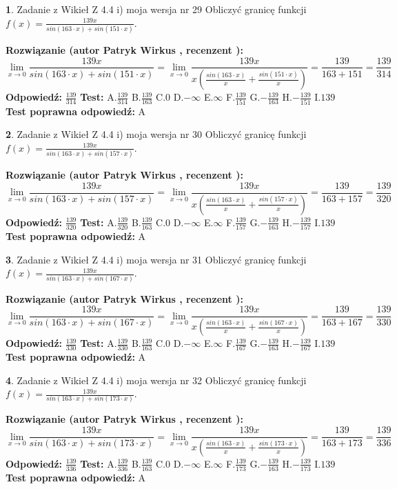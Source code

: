 \documentclass[12pt, a4paper]{article}
\theoremstyle{definition} %
\newtheorem{zad}{}
\newcommand{\zadStart}[1]{\begin{zad}#1\newline}
\newcommand{\zadStop}{\end{zad}}
\newcommand{\rozwStart}[2]{\noindent \textbf{Rozwiązanie (autor #1 , recenzent #2): }\newline}
\newcommand{\rozwStop}{\newline}
\newcommand{\odpStart}{\noindent \textbf{Odpowiedź:}\newline}
\newcommand{\odpStop}{\newline}
\newcommand{\testStart}{\noindent \textbf{Test:}\newline}
\newcommand{\testStop}{\newline}
\newcommand{\kluczStart}{\noindent \textbf{Test poprawna odpowiedź:}\newline}
\newcommand{\kluczStop}{\newline}
\begin{document}
\zadStart{Zadanie z Wikieł Z 4.4 i) moja wersja nr 29}
Obliczyć granicę funkcji $f(x)=\frac{139x}{sin(163\cdot x) +sin(151\cdot x)}$.
\zadStop
\rozwStart{Patryk Wirkus}{}
$$\lim\limits_{x\to 0}\frac{139x}{sin(163\cdot x) +sin(151\cdot x)}=\lim\limits_{x\to 0}\frac{139x}{x(\frac{sin(163\cdot x)}{x}+\frac{sin(151\cdot x)}{x})}=\frac{139}{163+151} = \frac{139}{314}$$
\rozwStop
\odpStart
$\frac{139}{314}$
\odpStop
\testStart
A.$\frac{139}{314}$
B.$\frac{139}{163}$
C.$0$
D.$-\infty$
E.$\infty$
F.$\frac{139}{151}$
G.$-\frac{139}{163}$
H.$-\frac{139}{151}$
I.$139$
\testStop
\kluczStart
A
\kluczStop



\zadStart{Zadanie z Wikieł Z 4.4 i) moja wersja nr 30}
Obliczyć granicę funkcji $f(x)=\frac{139x}{sin(163\cdot x) +sin(157\cdot x)}$.
\zadStop
\rozwStart{Patryk Wirkus}{}
$$\lim\limits_{x\to 0}\frac{139x}{sin(163\cdot x) +sin(157\cdot x)}=\lim\limits_{x\to 0}\frac{139x}{x(\frac{sin(163\cdot x)}{x}+\frac{sin(157\cdot x)}{x})}=\frac{139}{163+157} = \frac{139}{320}$$
\rozwStop
\odpStart
$\frac{139}{320}$
\odpStop
\testStart
A.$\frac{139}{320}$
B.$\frac{139}{163}$
C.$0$
D.$-\infty$
E.$\infty$
F.$\frac{139}{157}$
G.$-\frac{139}{163}$
H.$-\frac{139}{157}$
I.$139$
\testStop
\kluczStart
A
\kluczStop



\zadStart{Zadanie z Wikieł Z 4.4 i) moja wersja nr 31}
Obliczyć granicę funkcji $f(x)=\frac{139x}{sin(163\cdot x) +sin(167\cdot x)}$.
\zadStop
\rozwStart{Patryk Wirkus}{}
$$\lim\limits_{x\to 0}\frac{139x}{sin(163\cdot x) +sin(167\cdot x)}=\lim\limits_{x\to 0}\frac{139x}{x(\frac{sin(163\cdot x)}{x}+\frac{sin(167\cdot x)}{x})}=\frac{139}{163+167} = \frac{139}{330}$$
\rozwStop
\odpStart
$\frac{139}{330}$
\odpStop
\testStart
A.$\frac{139}{330}$
B.$\frac{139}{163}$
C.$0$
D.$-\infty$
E.$\infty$
F.$\frac{139}{167}$
G.$-\frac{139}{163}$
H.$-\frac{139}{167}$
I.$139$
\testStop
\kluczStart
A
\kluczStop



\zadStart{Zadanie z Wikieł Z 4.4 i) moja wersja nr 32}
Obliczyć granicę funkcji $f(x)=\frac{139x}{sin(163\cdot x) +sin(173\cdot x)}$.
\zadStop
\rozwStart{Patryk Wirkus}{}
$$\lim\limits_{x\to 0}\frac{139x}{sin(163\cdot x) +sin(173\cdot x)}=\lim\limits_{x\to 0}\frac{139x}{x(\frac{sin(163\cdot x)}{x}+\frac{sin(173\cdot x)}{x})}=\frac{139}{163+173} = \frac{139}{336}$$
\rozwStop
\odpStart
$\frac{139}{336}$
\odpStop
\testStart
A.$\frac{139}{336}$
B.$\frac{139}{163}$
C.$0$
D.$-\infty$
E.$\infty$
F.$\frac{139}{173}$
G.$-\frac{139}{163}$
H.$-\frac{139}{173}$
I.$139$
\testStop
\kluczStart
A
\kluczStop
\end{document}

